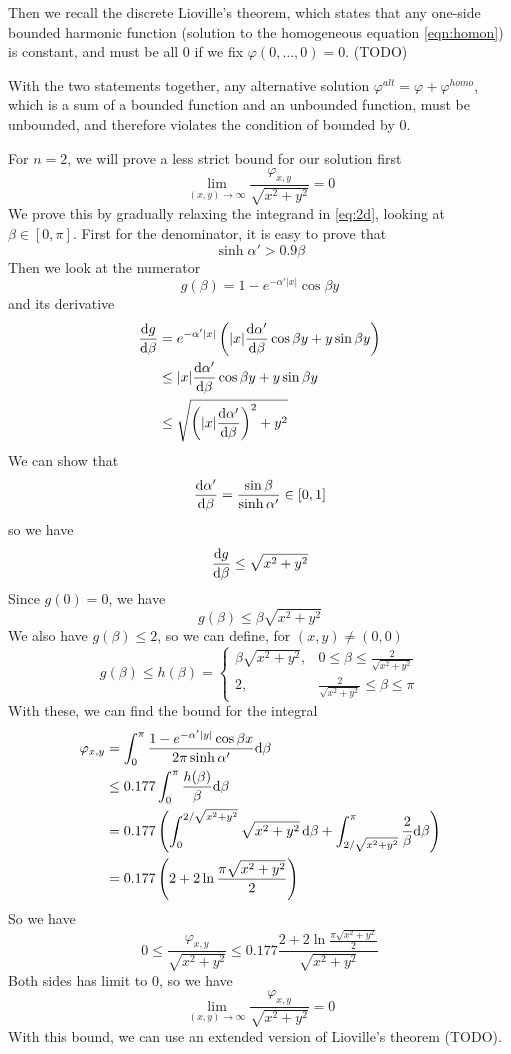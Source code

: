 \documentclass[10pt,a4paper,draft]{article}
\begin{document}
	
	Then we recall the discrete Lioville's theorem, which states that any one-side bounded harmonic function (solution to the homogeneous equation \eqref{eqn:homon}) is constant, and must be all 0 if we fix $\varphi(0,\dots,0) = 0$.  (TODO)
	
	With the two statements together, any alternative solution $\varphi^{alt} = \varphi + \varphi^{homo}$, which is a sum of a bounded function and an unbounded function, must be unbounded, and therefore violates the condition of bounded by 0.
	
	For $n = 2$, we will prove a less strict bound for our solution first
	\[
	\lim_{(x,y)\to\infty}\frac{\varphi_{x,y}}{\sqrt{x^2+y^2}} = 0
	\]
	We prove this by gradually relaxing the integrand in \eqref{eq:2d}, looking at $\beta \in [0, \pi]$. First for the denominator, it is easy to prove that
	\[
	\sinh\alpha' > 0.9\beta
	\]
	Then we look at the numerator
	\[
	g(\beta) = 1-e^{-\alpha' |x|}\cos\beta y
	\]
	and its derivative
	\begin{align*}
	\frac{\mathrm{d} g}{\mathrm{d} \beta} &= e^{-\alpha' |x|}\left(|x|\frac{\mathrm{d}\alpha'}{\mathrm{d}\beta}\cos\beta y + y \sin\beta y\right)\\
	& \leq|x|\frac{\mathrm{d}\alpha'}{\mathrm{d}\beta}\cos\beta y + y \sin\beta y \\ 
	& \leq\sqrt{\left(|x|\frac{\mathrm{d}\alpha'}{\mathrm{d}\beta}\right)^2+y^2}
	\end{align*}
	We can show that 
	\[
	\frac{\mathrm{d}\alpha'}{\mathrm{d}\beta} = \frac{\sin\beta}{\sinh\alpha'} \in [0,1]
	\]
	so we have
	\[
	\frac{\mathrm{d} g}{\mathrm{d} \beta}\leq\sqrt{x^2+y^2}
	\]
	Since $g(0) = 0$, we have
	\[
	g(\beta) \leq \beta \sqrt{x^2+y^2}
	\]
	We also have $g(\beta) \leq 2$, so we can define, for $(x,y)\neq(0,0)$
	\[
	g(\beta) \leq h(\beta) =\begin{cases}
	\beta \sqrt{x^2+y^2}, & 0\leq\beta\leq\frac{2}{\sqrt{x^2+y^2}}\\
	2, & \frac{2}{\sqrt{x^2+y^2}}\leq\beta\leq\pi
	\end{cases}
	\]
	With these, we can find the bound for the integral
	\begin{align*}
	\varphi_{x,y} &= \int_{0}^{\pi}\frac{1 - e^{-\alpha' |y|}\cos\beta x}{2\pi\sinh\alpha'}\mathrm{d}\beta \\
	&\leq 	0.177\int_{0}^{\pi}\frac{h(\beta)}{\beta}\mathrm{d}\beta \\
	&= 0.177\left(\int_{0}^{2/\sqrt{x^2+y^2}}\sqrt{x^2+y^2}\,\mathrm{d}\beta + \int_{2/\sqrt{x^2+y^2}}^{\pi}\frac{2}{\beta}\mathrm{d}\beta\right)\\
	&=0.177\left(2 + 2\ln\frac{\pi\sqrt{x^2+y^2}}{2}\right)
	\end{align*}
	So we have
	\[
	0\leq\frac{\varphi_{x,y}}{\sqrt{x^2+y^2}}\leq0.177\frac{2 + 2\ln\frac{\pi\sqrt{x^2+y^2}}{2}}{\sqrt{x^2+y^2}}
	\]
	Both sides has limit to 0, so we have 
	\[
	\lim_{(x,y)\to\infty}\frac{\varphi_{x,y}}{\sqrt{x^2+y^2}} = 0
	\]
	With this bound, we can use an extended version of Lioville's theorem (TODO).
	
\end{document}
